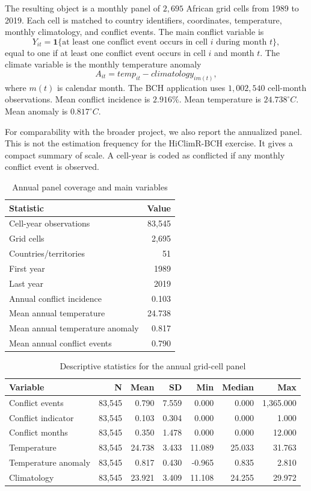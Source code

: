 \documentclass[
]{article}
\begin{document}
The resulting object is a monthly panel of \(2{,}695\) African grid
cells from 1989 to 2019. Each cell is matched to country identifiers,
coordinates, temperature, monthly climatology, and conflict events. The
main conflict variable is \[
Y_{it}=\mathbf 1\{\text{at least one conflict event occurs in cell } i \text{ during month } t\},
\] equal to one if at least one conflict event occurs in cell \(i\) and
month \(t\). The climate variable is the monthly temperature anomaly \[
A_{it}=temp_{it}-climatology_{im(t)},
\] where \(m(t)\) is calendar month. The BCH application uses
\(1{,}002{,}540\) cell-month observations. Mean conflict incidence is
\(2.916\%\). Mean temperature is \(24.738^\circ C\). Mean anomaly is
\(0.817^\circ C\).

For comparability with the broader project, we also report the
annualized panel. This is not the estimation frequency for the
HiClimR-BCH exercise. It gives a compact summary of scale. A cell-year
is coded as conflicted if any monthly conflict event is observed.

\begin{table}[H]
\centering
\caption{Annual panel coverage and main variables}
\label{tab:descriptive-panel-summary}
\begin{tabular}{lr}
\toprule
Statistic & Value\\
\midrule
Cell-year observations & 83,545\\
Grid cells & 2,695\\
Countries/territories & 51\\
First year & 1989\\
Last year & 2019\\
Annual conflict incidence & 0.103\\
Mean annual temperature & 24.738\\
Mean annual temperature anomaly & 0.817\\
Mean annual conflict events & 0.790\\
\bottomrule
\end{tabular}
\end{table}

\begin{table}[H]
\centering
\caption{Descriptive statistics for the annual grid-cell panel}
\label{tab:descriptive-variable-summary}
\scriptsize
\begin{tabular}{lrrrrrr}
\toprule
Variable & N & Mean & SD & Min & Median & Max\\
\midrule
Conflict events & 83,545 & 0.790 & 7.559 & 0.000 & 0.000 & 1,365.000\\
Conflict indicator & 83,545 & 0.103 & 0.304 & 0.000 & 0.000 & 1.000\\
Conflict months & 83,545 & 0.350 & 1.478 & 0.000 & 0.000 & 12.000\\
Temperature & 83,545 & 24.738 & 3.433 & 11.089 & 25.033 & 31.763\\
Temperature anomaly & 83,545 & 0.817 & 0.430 & -0.965 & 0.835 & 2.810\\
Climatology & 83,545 & 23.921 & 3.409 & 11.108 & 24.255 & 29.972\\
\bottomrule
\end{tabular}
\end{table}
\end{document}
